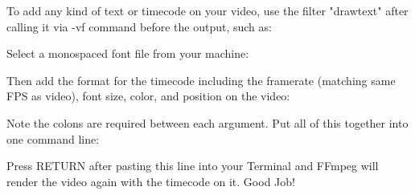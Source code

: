 \begin{fullwidth}
To add any kind of text or timecode on your video, use the filter "drawtext" after calling it via -vf command before the output, such as:


Select a monospaced font file from your machine:


Then add the format for the timecode including the framerate (matching same FPS as video), font size, color, and position on the video:


Note the colons are required between each argument. Put all of this together into one command line:



Press RETURN after pasting this line into your Terminal and FFmpeg will render the video again with the timecode on it. Good Job!


\clearpage

\end{fullwidth}